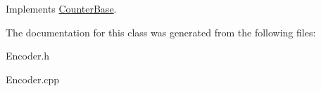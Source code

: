 \-Implements \hyperlink{classCounterBase}{\-Counter\-Base}.



\-The documentation for this class was generated from the following files\-:\begin{DoxyCompactItemize}
\item 
\-Encoder.\-h\item 
\-Encoder.\-cpp\end{DoxyCompactItemize}
